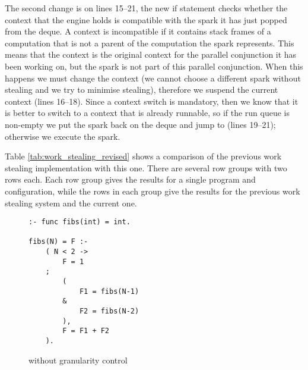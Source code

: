 The second change is on lines 15--21,
the new if statement checks whether the context that the engine holds is
compatible with the spark it has just popped from the deque.
A context is incompatible if it contains stack frames of a computation that
is not a parent of the computation the spark represents.
This means that the context is the original context for the parallel
conjunction it has been working on,
but the spark is not part of this parallel conjunction.
When this happens we must change the context
(we cannot choose a different spark without stealing and we try to minimise
stealing),
therefore we suspend the current context (lines 16--18).
Since a context switch is mandatory, then we know that it is better to
switch to a context that is already runnable,
so if the run queue is non-empty we put the spark back on the deque and jump
to \idle (lines 19--21);
otherwise we execute the spark.



Table \ref{tab:work_stealing_revised} shows a comparison of the previous
work stealing implementation with this one.
There are several row groups with two rows each.
Each row group gives the results for a single program and configuration,
while the rows in each group give the results for the previous work stealing
system and the current one.

\begin{figure}
\begin{verbatim}
:- func fibs(int) = int.

fibs(N) = F :-
    ( N < 2 ->
        F = 1
    ;
        (
            F1 = fibs(N-1)
        &
            F2 = fibs(N-2)
        ),
        F = F1 + F2
    ).
\end{verbatim}
\caption{\fibs without granularity control}
\label{fig:fibs}
\end{figure}

